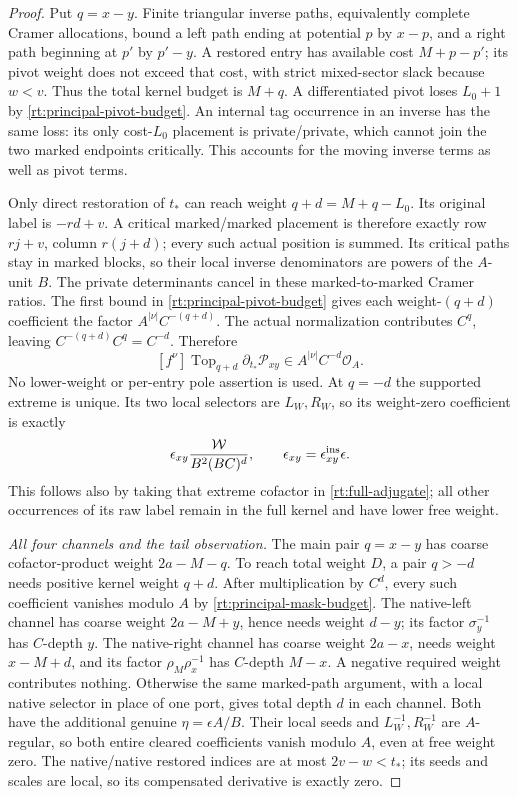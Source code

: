 \documentclass[11pt,a4paper]{amsart}
\numberwithin{equation}{section}
\theoremstyle{plain}
\theoremstyle{definition}
\begin{document}
\begin{proof}
Put \(q=x-y\).  Finite triangular inverse paths, equivalently
complete Cramer allocations, bound a left path ending at potential
\(p\) by \(x-p\), and a right path beginning at \(p'\) by \(p'-y\).
A restored entry has available cost \(M+p-p'\); its pivot weight
does not exceed that cost, with strict mixed-sector slack because
\(w<v\).  Thus the total kernel budget is \(M+q\).
A differentiated pivot loses \(L_0+1\) by
\eqref{rt:principal-pivot-budget}.  An internal tag occurrence in
an inverse has the same loss: its only cost-\(L_0\) placement is
private/private, which cannot join the two marked endpoints critically.
This accounts for the moving inverse terms as well as pivot terms.

Only direct restoration of \(t_*\) can reach weight
\(q+d=M+q-L_0\).  Its original label is \(-rd+v\).
A critical marked/marked placement is therefore exactly
row \(rj+v\), column \(r(j+d)\); every such actual position is
summed.  Its critical paths stay in marked blocks, so their local
inverse denominators are powers of the \(A\)-unit \(B\).
The private determinants cancel in these marked-to-marked Cramer
ratios.  The first bound in \eqref{rt:principal-pivot-budget} gives
each weight-\((q+d)\) coefficient the factor
\(A^{|\nu|}C^{-(q+d)}\).
The actual normalization contributes \(C^q\), leaving
\(C^{-(q+d)}C^q=C^{-d}\).  Therefore
\begin{equation}\label{rt:principal-mask-budget}
 [f^\nu]\operatorname{Top}_{q+d}
        \partial_{t_*}\mathcal P_{xy}
             \in A^{|\nu|}C^{-d}\mathcal O_A.
\end{equation}
No lower-weight or per-entry pole assertion is used.
At \(q=-d\) the supported extreme is unique.  Its two local
selectors are \(L_W,R_W\), so its weight-zero coefficient is exactly
\[
 \epsilon_{xy}\frac{\mathcal W}{B^2(BC)^d},\qquad
 \epsilon_{xy}=\epsilon^{\rm ins}_{xy}\epsilon.
\]
This follows also by taking that extreme cofactor in
\eqref{rt:full-adjugate}; all other occurrences of its raw label
remain in the full kernel and have lower free weight.

\smallskip\noindent\emph{All four channels and the tail observation.}
The main pair \(q=x-y\) has coarse cofactor-product weight
\(2a-M-q\).  To reach total weight \(D\), a pair \(q>-d\)
needs positive kernel weight \(q+d\).
After multiplication by \(C^d\), every such coefficient vanishes
modulo \(A\) by \eqref{rt:principal-mask-budget}.
The native-left channel has coarse weight \(2a-M+y\), hence
needs weight \(d-y\); its factor \(\sigma_y^{-1}\) has
\(C\)-depth \(y\).  The native-right channel has coarse weight
\(2a-x\), needs weight \(x-M+d\), and its factor
\(\rho_M\rho_x^{-1}\) has \(C\)-depth \(M-x\).
A negative required weight contributes nothing.  Otherwise the
same marked-path argument, with a local native selector in place
of one port, gives total depth \(d\) in each channel.
Both have the additional genuine \(\eta=\epsilon A/B\).
Their local seeds and \(L_W^{-1},R_W^{-1}\) are \(A\)-regular,
so both entire cleared coefficients vanish modulo \(A\), even
at free weight zero.
The native/native restored indices are at most \(2v-w<t_*\);
its seeds and scales are local, so its compensated derivative
is exactly zero.


\end{proof}
\end{document}
